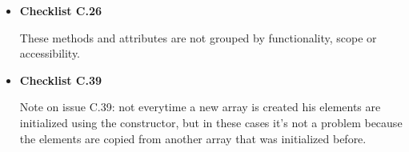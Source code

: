 \documentclass[../../../../codeInspection.tex]{subfiles}
\begin{document}
\begin{itemize}
		    \item \textbf{Checklist C.26}

		    	  

		    	  These methods and attributes are not grouped by functionality, scope or accessibility.

		    \item \textbf{Checklist C.39}

		    	  Note on issue C.39: not everytime a new array is created his elements are initialized using the constructor, but in these cases it's not a problem because the elements are copied from another array that was initialized before.

		\end{itemize}
\end{document}
